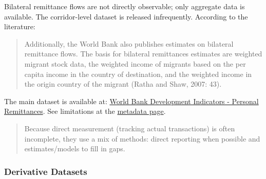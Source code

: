 \documentclass[
  11pt,
]{article}
\begin{document}
Bilateral remittance flows are not directly observable; only aggregate
data is available. The corridor-level dataset is released infrequently.
According to the literature:

\begin{quote}
Additionally, the World Bank also publishes estimates on bilateral
remittance flows. The basis for bilateral remittances estimates are
weighted migrant stock data, the weighted income of migrants based on
the per capita income in the country of destination, and the weighted
income in the origin country of the migrant (Ratha and Shaw, 2007: 43).
\end{quote}

The main dataset is available at:
\href{https://databank.worldbank.org/metadataglossary/world-development-indicators/series/BM.TRF.PWKR.CD.DT}{World
Bank Development Indicators - Personal Remittances}. See limitations at
the
\href{https://databank.worldbank.org/metadataglossary/world-development-indicators/series/BM.TRF.PWKR.CD.DT}{metadata
page}.

\begin{quote}
Because direct measurement (tracking actual transactions) is often
incomplete, they use a mix of methods: direct reporting when possible
and estimates/models to fill in gaps.
\end{quote}

\subsubsection{Derivative Datasets}\label{derivative-datasets}
\end{document}
